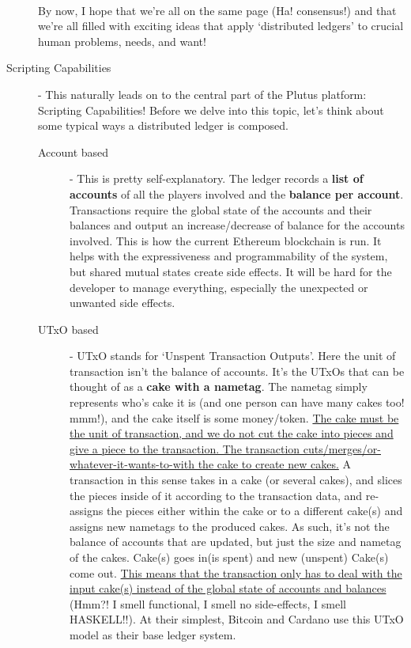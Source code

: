 \documentclass[a4paper, 11pt]{article}
\begin{document}
\begin{description}
        \paragraph{}By now, I hope that we're all on the same page (Ha! consensus!) and that we're all filled with exciting ideas that apply `distributed ledgers' to crucial human problems, needs, and want! 
        

        \item[Scripting Capabilities] - This naturally leads on to the central part of the Plutus platform: Scripting Capabilities! Before we delve into this topic, let's think about some typical ways a distributed ledger is composed.
        
        \begin{description}
            \item[Account based] - This is pretty self-explanatory. The ledger records a \textbf{list of accounts} of all the players involved and the \textbf{balance per account}. Transactions require the global state of the accounts and their balances and output an increase/decrease of balance for the accounts involved. This is how the current Ethereum blockchain is run. It helps with the expressiveness and programmability of the system, but shared mutual states create side effects. It will be hard for the developer to manage everything, especially the unexpected or unwanted side effects.
            \item[UTxO based] - UTxO stands for `Unspent Transaction Outputs'. Here the unit of transaction isn't the balance of accounts. It's the UTxOs that can be thought of as a \textbf{cake with a nametag}. The nametag simply represents who's cake it is (and one person can have many cakes too! mmm!), and the cake itself is some money/token. \ul{The cake must be the unit of transaction, and we do not cut the cake into pieces and give a piece to the transaction. The transaction cuts/merges/or-whatever-it-wants-to-with the cake to create new cakes.} A transaction in this sense takes in a cake (or several cakes), and slices the pieces inside of it according to the transaction data, and re-assigns the pieces either within the cake or to a different cake(s) and assigns new nametags to the produced cakes. As such, it's not the balance of accounts that are updated, but just the size and nametag of the cakes. Cake(s) goes in(is spent) and new (unspent) Cake(s) come out. \ul{This means that the transaction only has to deal with the input cake(s) instead of the global state of accounts and balances} (Hmm?! I smell functional, I smell no side-effects, I smell HASKELL!!). At their simplest, Bitcoin and Cardano use this UTxO model as their base ledger system.
        \end{description}
        

\end{description}
\end{document}
